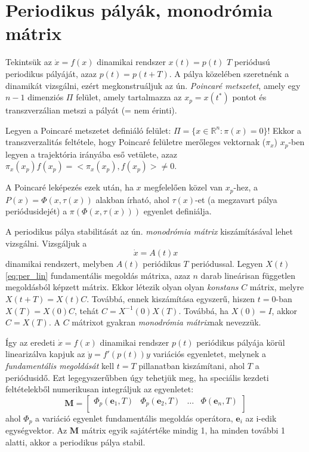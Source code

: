 \section{Periodikus pályák, monodrómia mátrix}

Tekintsük az $\dot{x}=f(x)$ dinamikai rendszer $x(t)=p(t)$ $T$ periódusú periodikus pályáját, azaz $p(t)=p(t+T)$. A pálya közelében szeretnénk a dinamikát vizsgálni, ezért megkonstruáljuk az ún. \emph{Poincaré metszetet}, amely egy $n-1$ dimenziós $\Pi$ felület, amely tartalmazza az $x_p=x(t^*)$ pontot és transzverzálian metszi a pályát (= nem érinti).

Legyen a Poincaré metszetet definiáló felület: $\Pi = \{x\in\mathbb{R}^n:\pi(x)=0\}$! Ekkor a transzverzalitás feltétele, hogy Poincaré felületre merőleges vektornak ($\pi_x$) $x_p$-ben legyen a trajektória irányába eső vetülete, azaz $\pi_x(x_p) f(x_p)=<\pi_x(x_p), f(x_p)>\neq 0$.

A Poincaré leképezés ezek után, ha $x$ megfelelően közel van $x_p$-hez, a $P(x)=\Phi(x,\tau(x))$ alakban írható, ahol $\tau(x)$-et (a megzavart pálya periódusidejét) a $\pi(\Phi(x,\tau(x)))$ egyenlet definiálja.


A periodikus pálya stabilitását az ún. \emph{monodrómia mátrix} kiszámításával lehet vizsgálni. Vizsgáljuk a
%
\begin{equation}
\dot{x}=A(t)x
\label{eq:per_lin}
\end{equation}
%
dinamikai rendszert, melyben $A(t)$ periódikus $T$ periódussal. Legyen $X(t)$ \eqref{eq:per_lin} fundamentális megoldás mátrixa, azaz $n$ darab lineárisan független megoldásból képzett mátrix. Ekkor létezik olyan olyan \emph{konstans} $C$ mátrix, melyre $X(t+T)=X(t)C$. Továbbá, ennek kiszámítása egyszerű, hiszen $t=0$-ban $X(T)=X(0)C$, tehát $C=X^{-1}(0)X(T)$. Továbbá, ha $X(0)=I$, akkor $C=X(T)$. A $C$ mátrixot gyakran \emph{monodrómia mátrix}nak nevezzük.

Így az eredeti $\dot{x}=f(x)$ dinamikai rendszer $p(t)$ periódikus pályája körül linearizálva kapjuk az $\dot y =f'(p(t))y$ variációs egyenletet, melynek a \emph{fundamentális megoldását} kell $t=T$ pillanatban kiszámítani, ahol $T$ a periódusidő. Ezt legegyszerűbben úgy tehetjük meg, ha speciális kezdeti feltételekből numerikusan integráljuk az egyenletet:
\[
\mathbf{M}=\begin{bmatrix}
\Phi_p(\mathbf{e}_1,T) & \Phi_p(\mathbf{e}_2,T) & \dots & \Phi(\mathbf{e}_n,T)\\
\end{bmatrix}
\]
ahol $\Phi_p$ a variáció egyenlet fundamentális megoldás operátora, $\mathbf{e}_i$ az i-edik egységvektor. Az $\mathbf{M}$ mátrix egyik sajátértéke mindig 1, ha minden további 1 alatti, akkor a periodikus pálya stabil.

